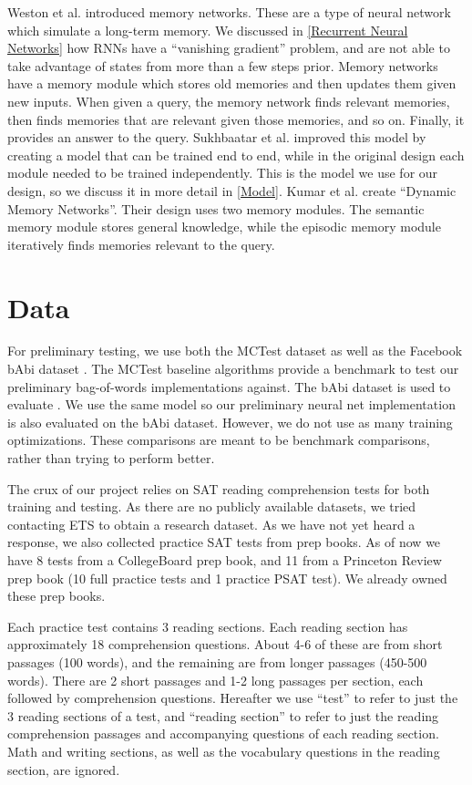 \documentclass[pageno]{jpaper}
\begin{document}
Weston et al.\cite{Weston2015a} introduced memory networks. These are a type of
neural network which simulate a long-term memory. We discussed in
\ref{Recurrent Neural Networks} how RNNs have a ``vanishing gradient'' problem,
and are not able to take advantage of states from more than a few steps prior.
Memory networks have a memory module which stores old memories and then updates
them given new inputs. When given a query, the memory network finds relevant
memories, then finds memories that are relevant given those memories, and so
on. Finally, it provides an answer to the query. Sukhbaatar et
al.\cite{Sukhbaatar2015} improved this model by creating a model that can be
trained end to end, while in the original design each module needed to be
trained independently. This is the model we use for our design, so we discuss
it in more detail in \ref{Model}. Kumar et al.\cite{Kumar2015} create ``Dynamic
Memory Networks''. Their design uses two memory modules. The semantic memory
module stores general knowledge, while the episodic memory module iteratively
finds memories relevant to the query.

\section{Data}
\label{Data}

For preliminary testing, we use both the MCTest \cite{Richardson2013} dataset as
well as the Facebook bAbi dataset \cite{Weston2015}. The MCTest baseline
algorithms provide a benchmark to test our preliminary bag-of-words
implementations against. The bAbi dataset is used to evaluate
\cite{Sukhbaatar2015}. We use the same model so our preliminary neural net
implementation is also evaluated on the bAbi dataset. However, we do not use as
many training optimizations. These comparisons are meant to be benchmark
comparisons, rather than trying to perform better.

The crux of our project relies on SAT reading comprehension tests for both
training and testing. As there are no publicly available datasets, we tried
contacting ETS to obtain a research dataset. As we have not yet heard a response,
we also collected practice SAT tests from prep books. As of now we have 8 tests
from a CollegeBoard prep book, and 11 from a Princeton Review prep book (10 full
practice tests and 1 practice PSAT test). We already owned these prep books.

Each practice test contains 3 reading sections. Each reading section has
approximately 18 comprehension questions. About 4-6 of these are from short
passages (100 words), and the remaining are from longer passages (450-500
words). There are 2 short passages and 1-2 long passages per section, each
followed by comprehension questions. Hereafter we use ``test'' to refer to just
the 3 reading sections of a test, and ``reading section'' to refer to just the
reading comprehension passages and accompanying questions of each reading
section. Math and writing sections, as well as the vocabulary questions in the
reading section, are ignored.
\end{document}
